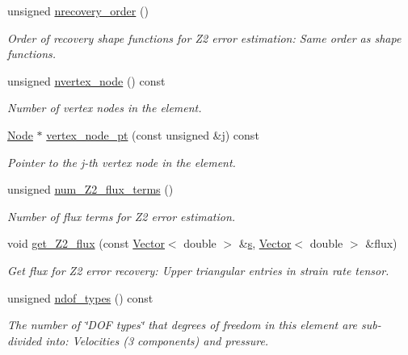 \begin{DoxyCompactItemize}
unsigned \hyperlink{classoomph_1_1AxisymmetricTTaylorHoodElement_a2cd7e8c1aafe58b6cc36eef0b201b9f2}{nrecovery\+\_\+order} ()
\begin{DoxyCompactList}\small\item\em Order of recovery shape functions for Z2 error estimation\+: Same order as shape functions. \end{DoxyCompactList}\item 
unsigned \hyperlink{classoomph_1_1AxisymmetricTTaylorHoodElement_a2a8cccdcdfd71e3c5f4c4ce07189442c}{nvertex\+\_\+node} () const
\begin{DoxyCompactList}\small\item\em Number of vertex nodes in the element. \end{DoxyCompactList}\item 
\hyperlink{classoomph_1_1Node}{Node} $\ast$ \hyperlink{classoomph_1_1AxisymmetricTTaylorHoodElement_a44d3195ac5946d8ea71ea5fe98120605}{vertex\+\_\+node\+\_\+pt} (const unsigned \&j) const
\begin{DoxyCompactList}\small\item\em Pointer to the j-\/th vertex node in the element. \end{DoxyCompactList}\item 
unsigned \hyperlink{classoomph_1_1AxisymmetricTTaylorHoodElement_ae84ae5860bbfdd54a5f8224f3b0caf46}{num\+\_\+\+Z2\+\_\+flux\+\_\+terms} ()
\begin{DoxyCompactList}\small\item\em Number of \textquotesingle{}flux\textquotesingle{} terms for Z2 error estimation. \end{DoxyCompactList}\item 
void \hyperlink{classoomph_1_1AxisymmetricTTaylorHoodElement_ac7cab08cebeb16771206d55497bde22a}{get\+\_\+\+Z2\+\_\+flux} (const \hyperlink{classoomph_1_1Vector}{Vector}$<$ double $>$ \&\hyperlink{cfortran_8h_ab7123126e4885ef647dd9c6e3807a21c}{s}, \hyperlink{classoomph_1_1Vector}{Vector}$<$ double $>$ \&flux)
\begin{DoxyCompactList}\small\item\em Get \textquotesingle{}flux\textquotesingle{} for Z2 error recovery\+: Upper triangular entries in strain rate tensor. \end{DoxyCompactList}\item 
unsigned \hyperlink{classoomph_1_1AxisymmetricTTaylorHoodElement_a5b492d4fc80759934938bd4c296f9237}{ndof\+\_\+types} () const
\begin{DoxyCompactList}\small\item\em The number of \char`\"{}\+D\+O\+F types\char`\"{} that degrees of freedom in this element are sub-\/divided into\+: Velocities (3 components) and pressure. \end{DoxyCompactList}\item 

\end{DoxyCompactItemize}
